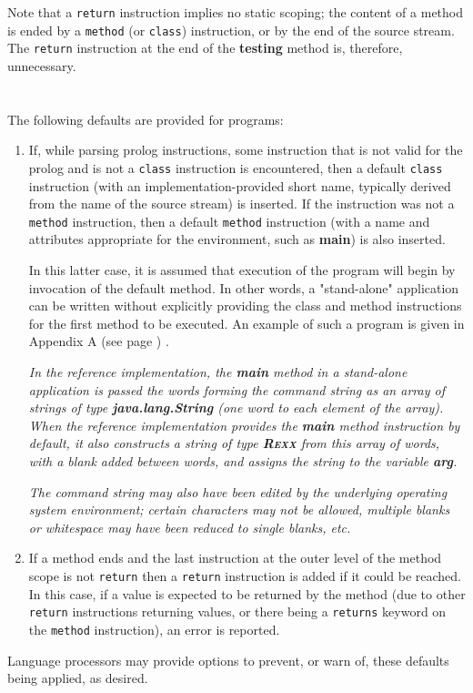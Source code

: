 Note that a \texttt{return} instruction implies no static scoping; the
content of a method is ended by a \texttt{method} (or \texttt{class})
instruction, or by the end of the source stream.
The \texttt{return} instruction at the end of the \textbf{testing}
method is, therefore, unnecessary.
\section{}\label{}
 
The following defaults are provided for \nr{} programs:
\begin{enumerate}
\item If, while parsing prolog instructions, some instruction that is not
valid for the prolog and is not a \texttt{class} instruction is
encountered, then a default \texttt{class} instruction (with an
implementation-provided short name, typically derived from the name of
the source stream) is inserted.  If the instruction was not a
\texttt{method} instruction, then a default \texttt{method} instruction
(with a name and attributes appropriate for the environment, such
as \textbf{main}) is also inserted.
 
In this latter case, it is assumed that execution of the program will
begin by invocation of the default method.
In other words, a "stand-alone" application can be written without
explicitly providing the class and method instructions for the first
method to be executed.
An example of such a program is given in  Appendix A (see page \pageref{refappa}) .

 
\emph{In the reference implementation, the \textbf{main} method in a
stand-alone application is passed the words forming the command string
as an array of strings of type \textbf{java.lang.String} (one word to
each element of the array).
When the \nr{} reference implementation provides the \textbf{main}
method instruction by default, it also constructs a \nr{} string of
type \textbf{R\textsc{exx}} from this array of words, with a blank added
between words, and assigns the string to the variable
\textbf{arg}.}
 
\emph{The command string may also have been edited by the underlying
operating system environment; certain characters may not be
allowed, multiple blanks or whitespace may have been reduced to
single blanks, etc.
}
\item If a method ends and the last instruction at the outer level of the
method scope is not \texttt{return} then a \texttt{return} instruction
is added if it could be reached.
In this case, if a value is expected to be returned by the method (due
to other \texttt{return} instructions returning values, or there being a
\texttt{returns} keyword on the \texttt{method} instruction), an error
is reported.
\end{enumerate}
 
Language processors may provide options to prevent, or warn of, these
defaults being applied, as desired.
